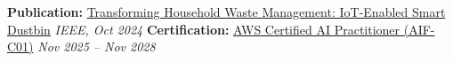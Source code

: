 \documentclass[letterpaper,8pt]{extarticle}
\begin{document}
\vspace{2pt}
\noindent\textbf{Publication: }
\href{https://ieeexplore.ieee.org/document/10696336}
{\textcolor{linkblue}{Transforming Household Waste Management: IoT-Enabled Smart Dustbin}}
\hfill \textit{IEEE, Oct 2024}
\newline
\noindent\textbf{Certification:}
\href{https://www.credly.com/badges/50ee6a3c-0bf9-4e94-bc85-e59258c126ec/public_url}{\textcolor{linkblue}{AWS Certified AI Practitioner (AIF-C01)}}
\hfill \textit{Nov 2025 -- Nov 2028}
\end{document}
